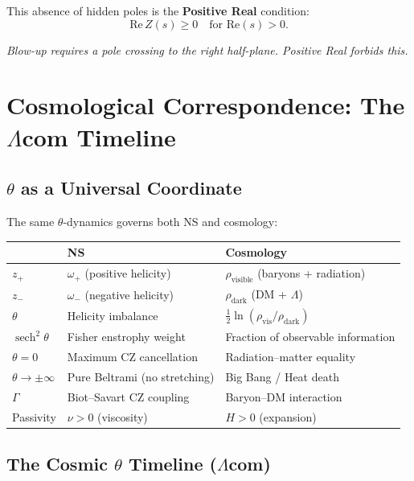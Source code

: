 \documentclass[12pt,a4paper]{article}
\theoremstyle{definition}
\newcommand{\sech}{\operatorname{sech}}
\begin{document}
This absence of hidden poles is the \textbf{Positive Real} condition:
\begin{equation}
  \mathrm{Re}\,Z(s) \geq 0 \quad \text{for } \mathrm{Re}(s) > 0.
\end{equation}

\emph{Blow-up requires a pole crossing to the right half-plane. Positive Real forbids this.}

\section{Cosmological Correspondence: The $\Lambda$com Timeline}\label{sec:cosmo}

\subsection{$\theta$ as a Universal Coordinate}

The same $\theta$-dynamics governs both NS and cosmology:

\begin{center}
\begin{tabular}{lll}
\toprule
& \textbf{NS} & \textbf{Cosmology} \\
\midrule
$z_+$ & $\omega_+$ (positive helicity) & $\rho_{\mathrm{visible}}$ (baryons + radiation) \\
$z_-$ & $\omega_-$ (negative helicity) & $\rho_{\mathrm{dark}}$ (DM + $\Lambda$) \\
$\theta$ & Helicity imbalance & $\frac{1}{2}\ln(\rho_{\mathrm{vis}}/\rho_{\mathrm{dark}})$ \\
$\sech^2\theta$ & Fisher enstrophy weight & Fraction of observable information \\
$\theta = 0$ & Maximum CZ cancellation & Radiation--matter equality \\
$\theta \to \pm\infty$ & Pure Beltrami (no stretching) & Big Bang / Heat death \\
$\Gamma$ & Biot--Savart CZ coupling & Baryon--DM interaction \\
Passivity & $\nu > 0$ (viscosity) & $H > 0$ (expansion) \\
\bottomrule
\end{tabular}
\end{center}

\subsection{The Cosmic $\theta$ Timeline ($\Lambda$com)}
\end{document}
